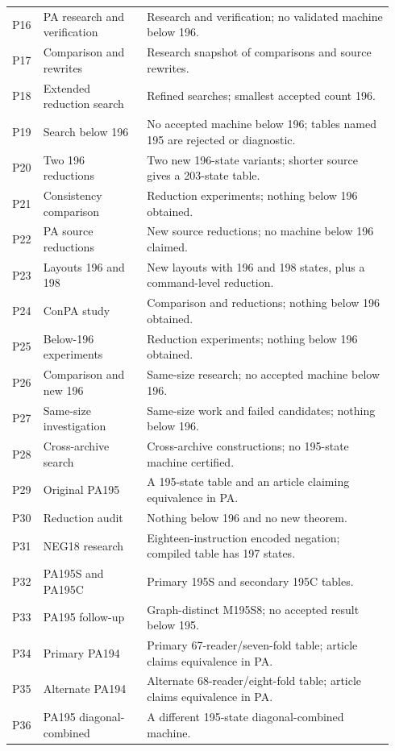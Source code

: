 \begin{longtable}{@{}p{0.06\linewidth}p{0.26\linewidth}p{0.62\linewidth}@{}}
P16 & PA research and verification & Research and verification; no validated machine below 196. \\
P17 & Comparison and rewrites & Research snapshot of comparisons and source rewrites. \\
P18 & Extended reduction search & Refined searches; smallest accepted count 196. \\
P19 & Search below 196 & No accepted machine below 196; tables named 195 are rejected or diagnostic. \\
P20 & Two 196 reductions & Two new 196-state variants; shorter source gives a 203-state table. \\
P21 & Consistency comparison & Reduction experiments; nothing below 196 obtained. \\
P22 & PA source reductions & New source reductions; no machine below 196 claimed. \\
P23 & Layouts 196 and 198 & New layouts with 196 and 198 states, plus a command-level reduction. \\
P24 & ConPA study & Comparison and reductions; nothing below 196 obtained. \\
P25 & Below-196 experiments & Reduction experiments; nothing below 196 obtained. \\
P26 & Comparison and new 196 & Same-size research; no accepted machine below 196. \\
P27 & Same-size investigation & Same-size work and failed candidates; nothing below 196. \\
P28 & Cross-archive search & Cross-archive constructions; no 195-state machine certified. \\
P29 & Original PA195 & A 195-state table and an article claiming equivalence in PA. \\
P30 & Reduction audit & Nothing below 196 and no new theorem. \\
P31 & NEG18 research & Eighteen-instruction encoded negation; compiled table has 197 states. \\
P32 & PA195S and PA195C & Primary 195S and secondary 195C tables. \\
P33 & PA195 follow-up & Graph-distinct M195S8; no accepted result below 195. \\
P34 & Primary PA194 & Primary 67-reader/seven-fold table; article claims equivalence in PA. \\
P35 & Alternate PA194 & Alternate 68-reader/eight-fold table; article claims equivalence in PA. \\
P36 & PA195 diagonal-combined & A different 195-state diagonal-combined machine. \\

\end{longtable}
